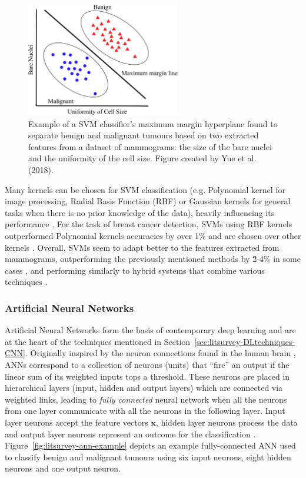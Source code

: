 \begin{figure}[ht]
\centerline{\includegraphics[width=0.6\textwidth]{Dissertation/figures/litsurvey/svm.png}}
\caption{\label{fig:litsurvey-svm-example}Example of a SVM classifier's maximum margin hyperplane found to separate benign and malignant tumours based on two extracted features from a dataset of mammograms: the size of the bare nuclei and the uniformity of the cell size. Figure created by Yue et al. (2018).}
\end{figure}

Many kernels can be chosen for SVM classification (e.g. Polynomial kernel for image processing, Radial Basis Function (RBF) or Gaussian kernels for general tasks when there is no prior knowledge of the data), heavily influencing its performance \citep{amari1999improving}. For the task of breast cancer detection, SVMs using RBF kernels outperformed Polynomial kernels accuracies by over 1\% \citep{Osareh2010} and are chosen over other kernels \citep{Asri2016}. Overall, SVMs seem to  adapt better to the features extracted from mammograms, outperforming the previously mentioned methods by  2-4\% in some cases \citep{Asri2016}, and performing similarly to hybrid systems that combine various techniques \citep{Yue2018}.

\subsubsection{Artificial Neural Networks}

Artificial Neural Networks form the basis of contemporary deep learning and are at the heart of the techniques mentioned in Section~\ref{sec:litsurvey-DLtechniques-CNN}. Originally inspired by the neuron connections found in the human brain \citep{mcculloch1943logical}, ANNs correspond to a collection of neurons (units) that ``fire'' an output if the linear sum of its weighted inputs tops a threshold. These neurons are placed in hierarchical layers (input, hidden and output layers) which are connected via weighted links, leading to \textit{fully connected} neural network when all the neurons from one layer communicate with all the neurons in the following layer. Input layer neurons accept the feature vectors $\textbf{x}$, hidden layer neurons process the data and output layer neurons represent an outcome for the classification \citep{russell2002artificial}. Figure~\ref{fig:litsurvey-ann-example} depicts an example fully-connected ANN used to classify benign and malignant tumours using six input neurons, eight hidden neurons and one output neuron.\\

